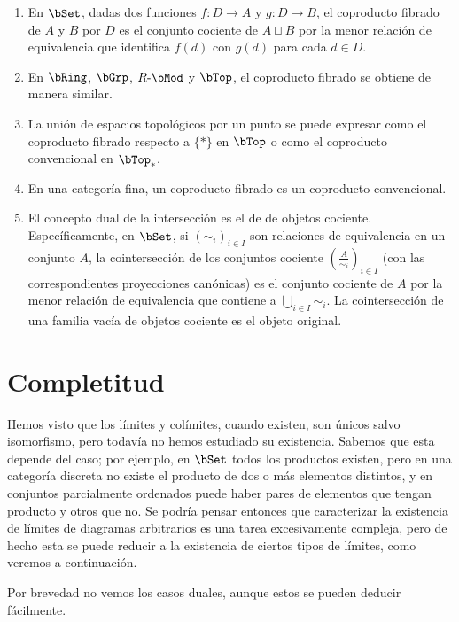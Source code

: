 \begin{example}\;
  \begin{enumerate}
  \item En $\bSet$, dadas dos funciones $f:D\to A$ y $g:D\to B$, el coproducto
    fibrado de $A$ y $B$ por $D$ es el conjunto cociente de $A\sqcup B$ por la
    menor relación de equivalencia que identifica $f(d)$ con $g(d)$ para cada
    $d\in D$.
  \item En $\bRing$, $\bGrp$, $R\dash\bMod$ y $\bTop$, el coproducto fibrado se
    obtiene de manera similar.
  \item La unión de espacios topológicos por un punto se puede expresar como el
    coproducto fibrado respecto a $\{*\}$ en $\bTop$ o como el coproducto
    convencional en $\bTop_*$.
  \item En una categoría fina, un coproducto fibrado es un coproducto
    convencional.
  \item El concepto dual de la intersección es el de  de
    objetos cociente. Específicamente, en $\bSet$, si $(\sim_i)_{i\in I}$ son
    relaciones de equivalencia en un conjunto $A$, la cointersección de los
    conjuntos cociente $(\frac{A}{\sim_i})_{i\in I}$ (con las correspondientes
    proyecciones canónicas) es el conjunto cociente de $A$ por la menor relación
    de equivalencia que contiene a $\bigcup_{i\in I}\sim_i$. La cointersección
    de una familia vacía de objetos cociente es el objeto original.
  \end{enumerate}
\end{example}

\section{Completitud}

Hemos visto que los límites y colímites, cuando existen, son únicos salvo
isomorfismo, pero todavía no hemos estudiado su existencia. Sabemos que esta
depende del caso; por ejemplo, en $\bSet$ todos los productos existen, pero en
una categoría discreta no existe el producto de dos o más elementos distintos, y
en conjuntos parcialmente ordenados puede haber pares de elementos que tengan
producto y otros que no. Se podría pensar entonces que caracterizar la
existencia de límites de diagramas arbitrarios es una tarea excesivamente
compleja, pero de hecho esta se puede reducir a la existencia de ciertos tipos
de límites, como veremos a continuación.

Por brevedad no vemos los casos duales, aunque estos se pueden deducir fácilmente.

